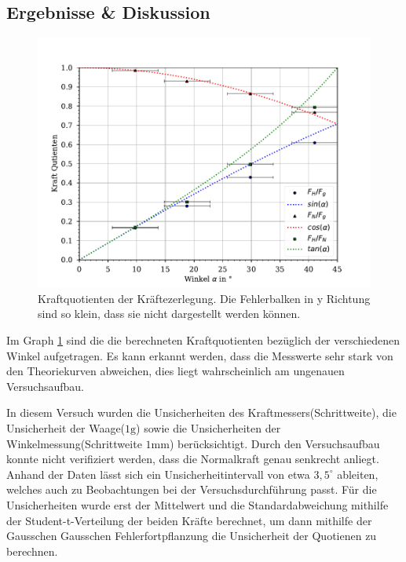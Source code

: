 \documentclass[11pt, a4paper]{article}
\begin{document}
    \subsection{Ergebnisse \& Diskussion}
    \begin{figure}
        \centering
        \includegraphics[width=\textwidth]{./5Kraftzer.pdf}

        \caption{Kraftquotienten der Kräftezerlegung. 
        Die Fehlerbalken in y Richtung sind so klein, dass sie nicht dargestellt werden können.}
        \label{fig:Kraftzer}
    \end{figure}
    Im Graph \ref{fig:Kraftzer} sind die die berechneten Kraftquotienten bezüglich der verschiedenen Winkel aufgetragen.
    Es kann erkannt werden, dass die Messwerte sehr stark von den Theoriekurven abweichen, dies liegt wahrscheinlich
    am ungenauen Versuchsaufbau.
    
    In diesem Versuch wurden die Unsicherheiten des Kraftmessers(Schrittweite), die Unsicherheit der Waage($1\si{\gram}$)
    sowie die Unsicherheiten der Winkelmessung(Schrittweite $1 \si{\milli\metre}$) berücksichtigt.
    Durch den Versuchsaufbau konnte nicht verifiziert werden, dass die Normalkraft genau senkrecht anliegt.
    Anhand der Daten lässt sich ein Unsicherheitintervall von etwa $3,5^{\circ}$ ableiten, welches auch zu
    Beobachtungen bei der Versuchsdurchführung passt. Für die Unsicherheiten wurde erst der Mittelwert \cite[(29)]{ABW}
    und die Standardabweichung mithilfe der Student-t-Verteilung \cite[(15)]{ABW} der beiden Kräfte berechnet, um dann mithilfe der Gausschen
    Gausschen Fehlerfortpflanzung \cite[(19)]{ABW} die Unsicherheit der Quotienen zu berechnen.
\end{document}
